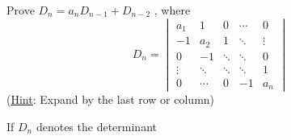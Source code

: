 \documentclass[11pt]{amsbook}
\begin{document}
\begin{exercise}
	Prove 
		$ D_n = a_n D_{n-1} + D_{n-2} $
	, where
	\begin{equation*}
		D_n =
		\begin{vmatrix}
			a_1 		& 1	 	& 0 		& \cdots 	& 0		\\
			-1	 	& a_2	& 1 		& \ddots	& \vdots	\\
			0		& -1		& \ddots	& \ddots	& 0		\\
			\vdots	& \ddots	& \ddots	& \ddots	& 1		\\
			0		& \cdots 	& 0 		& -1 		& a_n
		\end{vmatrix}
	\end{equation*}
	(\underline{Hint}: Expand by the last row or column)
\end{exercise}
\begin{exercise}
	If $D_n$ denotes the determinant
\end{exercise}





\end{document}
